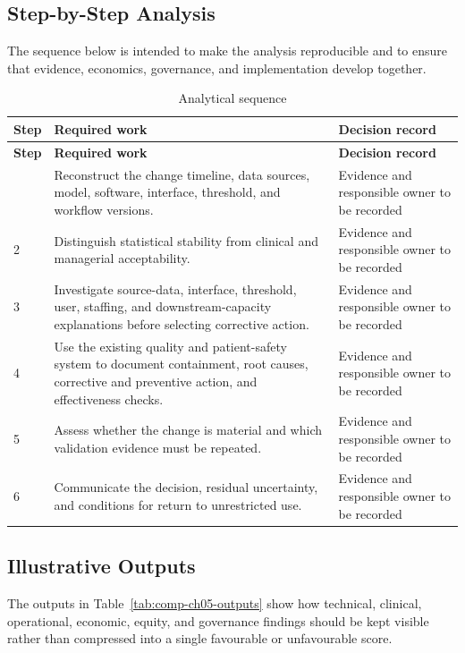 \subsection{Step-by-Step Analysis}
The sequence below is intended to make the analysis reproducible and to ensure
that evidence, economics, governance, and implementation develop together.

\begin{longtable}{@{}p{}p{}p{}@{}}
\caption{Analytical sequence}
\label{tab:comp-ch05-analysis-steps}\\
\toprule
\textbf{Step} & \textbf{Required work} & \textbf{Decision record} \\
\midrule
\endfirsthead
\toprule
\textbf{Step} & \textbf{Required work} & \textbf{Decision record} \\
\midrule
\endhead
\bottomrule
\endlastfoot
1 & Reconstruct the change timeline, data sources, model, software, interface, threshold, and workflow versions. & Evidence and responsible owner to be recorded \\
2 & Distinguish statistical stability from clinical and managerial acceptability. & Evidence and responsible owner to be recorded \\
3 & Investigate source-data, interface, threshold, user, staffing, and downstream-capacity explanations before selecting corrective action. & Evidence and responsible owner to be recorded \\
4 & Use the existing quality and patient-safety system to document containment, root causes, corrective and preventive action, and effectiveness checks. & Evidence and responsible owner to be recorded \\
5 & Assess whether the change is material and which validation evidence must be repeated. & Evidence and responsible owner to be recorded \\
6 & Communicate the decision, residual uncertainty, and conditions for return to unrestricted use. & Evidence and responsible owner to be recorded \\
\end{longtable}

\subsection{Illustrative Outputs}
The outputs in Table~\ref{tab:comp-ch05-outputs} show how technical,
clinical, operational, economic, equity, and governance findings should be kept
visible rather than compressed into a single favourable or unfavourable score.

